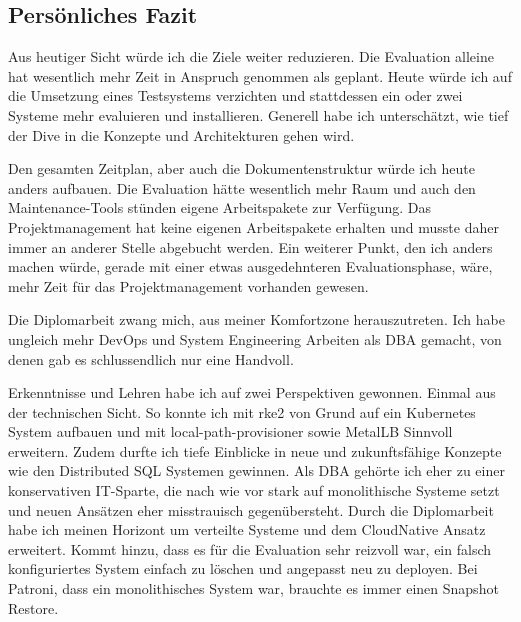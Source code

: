 
\begin{flushleft}
    \section{Persönliches Fazit}
    Aus heutiger Sicht würde ich die Ziele weiter reduzieren.
    Die Evaluation alleine hat wesentlich mehr Zeit in Anspruch genommen als geplant.
    Heute würde ich auf die Umsetzung eines Testsystems verzichten und stattdessen ein oder zwei Systeme mehr evaluieren und installieren.
    Generell habe ich unterschätzt, wie tief der Dive in die Konzepte und Architekturen gehen wird.
\end{flushleft}
\begin{flushleft}
    Den gesamten Zeitplan, aber auch die Dokumentenstruktur würde ich heute anders aufbauen.
    Die Evaluation hätte wesentlich mehr Raum und auch den Maintenance-Tools stünden eigene Arbeitspakete zur Verfügung.
    Das Projektmanagement hat keine eigenen Arbeitspakete erhalten und musste daher immer an anderer Stelle abgebucht werden.
    Ein weiterer Punkt, den ich anders machen würde, gerade mit einer etwas ausgedehnteren Evaluationsphase, wäre, mehr Zeit für das Projektmanagement vorhanden gewesen.
\end{flushleft}
\begin{flushleft}
    Die Diplomarbeit zwang mich, aus meiner Komfortzone herauszutreten.
    Ich habe ungleich mehr DevOps und System Engineering Arbeiten als DBA gemacht, von denen gab es schlussendlich nur eine Handvoll.
\end{flushleft}
\begin{flushleft}
    Erkenntnisse und Lehren habe ich auf zwei Perspektiven gewonnen.
    Einmal aus der technischen Sicht.
    So konnte ich mit \gls{rke2} von Grund auf ein \Gls{Kubernetes} System aufbauen und mit \gls{local-path-provisioner} sowie \Gls{MetalLB} Sinnvoll erweitern.
    Zudem durfte ich tiefe Einblicke in neue und zukunftsfähige Konzepte wie den Distributed SQL Systemen gewinnen.
    Als DBA gehörte ich eher zu einer konservativen IT-Sparte, die nach wie vor stark auf monolithische Systeme setzt und neuen Ansätzen eher misstrauisch gegenübersteht.
    Durch die Diplomarbeit habe ich meinen Horizont um verteilte Systeme und dem CloudNative Ansatz erweitert.
    Kommt hinzu, dass es für die Evaluation sehr reizvoll war, ein falsch konfiguriertes System einfach zu löschen und angepasst neu zu deployen.
    Bei Patroni, dass ein monolithisches System war, brauchte es immer einen Snapshot Restore.
\end{flushleft}
